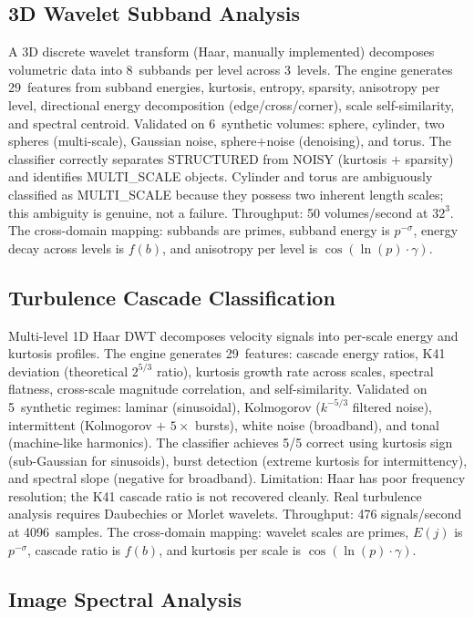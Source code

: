 \documentclass[11pt]{amsart}
\begin{document}
\subsection{3D Wavelet Subband Analysis}

A 3D discrete wavelet transform (Haar, manually implemented) decomposes
volumetric data into 8~subbands per level across 3~levels. The engine
generates 29~features from subband energies, kurtosis, entropy, sparsity,
anisotropy per level, directional energy decomposition (edge/cross/corner),
scale self-similarity, and spectral centroid. Validated on 6~synthetic
volumes: sphere, cylinder, two spheres (multi-scale), Gaussian noise,
sphere$+$noise (denoising), and torus. The classifier correctly separates
STRUCTURED from NOISY (kurtosis $+$ sparsity) and identifies MULTI\_SCALE
objects. Cylinder and torus are ambiguously classified as MULTI\_SCALE
because they possess two inherent length scales; this ambiguity is genuine,
not a failure. Throughput: 50 volumes/second at $32^3$. The cross-domain
mapping: subbands are primes, subband energy is $p^{-\sigma}$, energy decay
across levels is $f(b)$, and anisotropy per level is
$\cos(\ln(p)\cdot\gamma)$.

\subsection{Turbulence Cascade Classification}

Multi-level 1D Haar DWT decomposes velocity signals into per-scale energy
and kurtosis profiles. The engine generates 29~features: cascade energy
ratios, K41 deviation (theoretical $2^{5/3}$ ratio), kurtosis growth rate
across scales, spectral flatness, cross-scale magnitude correlation, and
self-similarity. Validated on 5~synthetic regimes: laminar (sinusoidal),
Kolmogorov ($k^{-5/3}$ filtered noise), intermittent (Kolmogorov $+$ $5\times$
bursts), white noise (broadband), and tonal (machine-like harmonics). The
classifier achieves 5/5 correct using kurtosis sign (sub-Gaussian for
sinusoids), burst detection (extreme kurtosis for intermittency), and
spectral slope (negative for broadband). Limitation: Haar has poor frequency
resolution; the K41 cascade ratio is not recovered cleanly. Real turbulence
analysis requires Daubechies or Morlet wavelets. Throughput: 476
signals/second at 4096~samples. The cross-domain mapping: wavelet scales are
primes, $E(j)$ is $p^{-\sigma}$, cascade ratio is $f(b)$, and kurtosis per
scale is $\cos(\ln(p)\cdot\gamma)$.

\subsection{Image Spectral Analysis}
\end{document}

